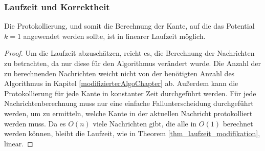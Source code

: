 \subsubsection{Laufzeit und Korrektheit}


	\begin{theorem}
		Die Protokollierung, und somit die Berechnung der Kante, auf die das Potential $k=1$ angewendet werden sollte, ist in linearer Laufzeit möglich.
	\end{theorem}
	\begin{proof}
		Um die Laufzeit abzuschätzen, reicht es, die Berechnung der Nachrichten zu betrachten, da nur diese für den Algorithmus verändert wurde. Die Anzahl der zu berechnenden Nachrichten weicht nicht von der benötigten Anzahl des Algorithmus in Kapitel \ref{modifizierterAlgoChapter} ab. Außerdem kann die Protokollierung für jede Kante in konstanter Zeit durchgeführt werden. Für jede Nachrichtenberechnung muss nur eine einfache Fallunterscheidung durchgeführt werden, um zu ermitteln, welche Kante in der aktuellen Nachricht protokolliert werden muss. Da es $O(n)$ viele Nachrichten gibt, die alle in $O(1)$ berechnet werden können, bleibt die Laufzeit, wie in Theorem \ref{thm_laufzeit_modifikation}, linear.
	\end{proof}
	
